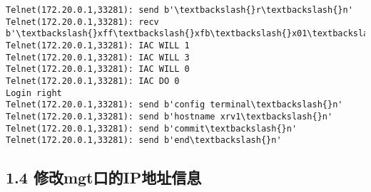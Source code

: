 \documentclass[11pt]{article}
\begin{document}
    \begin{Verbatim}[commandchars=\\\{\}]
Telnet(172.20.0.1,33281): send b'\textbackslash{}r\textbackslash{}n'
Telnet(172.20.0.1,33281): recv b'\textbackslash{}xff\textbackslash{}xfb\textbackslash{}x01\textbackslash{}xff\textbackslash{}xfb\textbackslash{}x03\textbackslash{}xff\textbackslash{}xfb\textbackslash{}x00\textbackslash{}xff\textbackslash{}xfd\textbackslash{}x00\textbackslash{}x1b]0;xrv1\textbackslash{}x07\textbackslash{}r\textbackslash{}n\textbackslash{}rRP/0/0/CPU0:xrv1\#\textbackslash{}r\textbackslash{}n\textbackslash{}rRP/0/0'
Telnet(172.20.0.1,33281): IAC WILL 1
Telnet(172.20.0.1,33281): IAC WILL 3
Telnet(172.20.0.1,33281): IAC WILL 0
Telnet(172.20.0.1,33281): IAC DO 0
Login right
Telnet(172.20.0.1,33281): send b'config terminal\textbackslash{}n'
Telnet(172.20.0.1,33281): send b'hostname xrv1\textbackslash{}n'
Telnet(172.20.0.1,33281): send b'commit\textbackslash{}n'
Telnet(172.20.0.1,33281): send b'end\textbackslash{}n'

    \end{Verbatim}

    \hypertarget{ux4feeux6539mgtux53e3ux7684ipux5730ux5740ux4fe1ux606f}{%
\subsection{1.4
修改mgt口的IP地址信息}\label{ux4feeux6539mgtux53e3ux7684ipux5730ux5740ux4fe1ux606f}}
\end{document}

